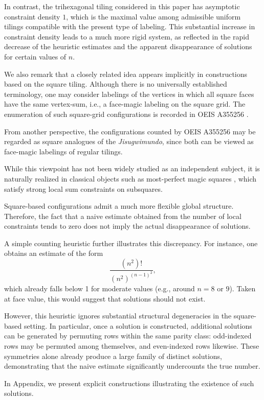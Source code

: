\documentclass[11pt]{article}
\theoremstyle{plain}
\theoremstyle{definition}
\begin{document}
In contrast, the trihexagonal tiling considered in this paper has asymptotic constraint density \(1\), which is the maximal value among admissible uniform tilings compatible with the present type of labeling. This substantial increase in constraint density leads to a much more rigid system, as reflected in the rapid decrease of the heuristic estimates and the apparent disappearance of solutions for certain values of \(n\).


We also remark that a closely related idea appears implicitly in constructions based on the square tiling. Although there is no universally established terminology, one may consider labelings of the vertices in which all square faces have the same vertex-sum, i.e., a face-magic labeling on the square grid. The enumeration of such square-grid configurations is recorded in OEIS A355256 \cite{OEISA355256}.


From another perspective, the configurations counted by OEIS A355256 may be regarded as square analogues of the \emph{Jisugwimundo}, since both can be viewed as face-magic labelings of regular tilings.

While this viewpoint has not been widely studied as an independent subject, it is naturally realized in classical objects such as most-perfect magic squares \cite{OllerenshawBree1998}, which satisfy strong local sum constraints on subsquares. 


Square-based configurations admit a much more flexible global structure. 
Therefore, the fact that a naive estimate obtained from the number of local
constraints tends to zero does not imply the actual disappearance of solutions.

A simple counting heuristic further illustrates this discrepancy. For instance,
one obtains an estimate of the form
\[
\frac{(n^2)!}{(n^2)^{(n-1)^2}},
\]
which already falls below 1 for moderate values (e.g., around $n=8$ or $9$).
Taken at face value, this would suggest that solutions should not exist.

However, this heuristic ignores substantial structural degeneracies in the
square-based setting. In particular, once a solution is constructed, additional
solutions can be generated by permuting rows within the same parity class:
odd-indexed rows may be permuted among themselves, and even-indexed rows
likewise. These symmetries alone already produce a large family of distinct
solutions, demonstrating that the naive estimate significantly undercounts the
true number.

In Appendix, we present explicit constructions illustrating the existence of
such solutions.
\end{document}
